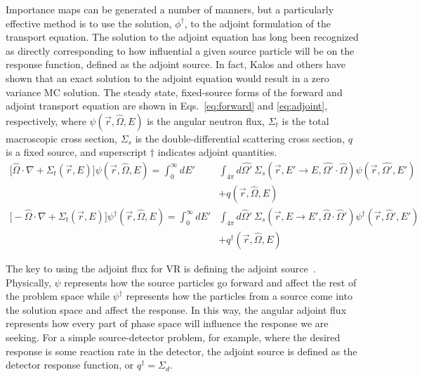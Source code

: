 \documentclass[12pt]{article}
\begin{document}
Importance maps can be generated a number of manners, but a particularly effective method is to use the solution, $\phi^{\dagger}$, to the adjoint formulation of the transport equation. 
The solution to the adjoint equation has long been recognized as 
directly corresponding to how influential a given source particle will be on the response function, defined as the adjoint source.
In fact, Kalos \cite{kalos_importance_1963, goertzel_monte_1958} and others have shown that an exact solution to the adjoint equation would result in a zero variance MC solution. 
The steady state, fixed-source forms of the forward and adjoint transport equation are shown in Eqs.~\ref{eq:forward} and \ref{eq:adjoint}, respectively, where $\psi(\vec{r}, \hat{\Omega}, E)$ is the angular neutron flux, $\Sigma_t$ is the total macroscopic cross section, $\Sigma_s$ is the double-differential scattering cross section, $q$ is a fixed source, and superscript $\dagger$ indicates adjoint quantities.
\begin{subequations} 
\label{eq:transport}
\begin{align}
\bigl[\hat{\Omega} \cdot \nabla + {\ensuremath{\Sigma}}_t(\vec{r}, E)\bigr] \psi(\vec{r}, \hat{\Omega}, E)  =  \int_0^{\infty} dE' &\int_{4\pi} d\hat{\Omega'} \:{\ensuremath{\Sigma}}_{s}(\vec{r}, E' \to E, \hat{\Omega'} \cdot \hat{\Omega}) \psi(\vec{r}, \hat{\Omega'}, E')\nonumber \\
 &+ q(\vec{r}, {\ensuremath{\hat{\Omega}}}, E) \label{eq:forward} \\
\bigl[-{\ensuremath{\hat{\Omega}}} \cdot \nabla + \Sigma_t({\ensuremath{\vec{r}}}, E)\bigr] \psi^{\dagger}(\vec{r}, {\ensuremath{\hat{\Omega}}}, E) = \int_0^{\infty} dE' &\int_{4\pi} d{\ensuremath{\hat{\Omega}}}' \: \Sigma_s({\ensuremath{\vec{r}}}, E \rightarrow E', {\ensuremath{\hat{\Omega}}} \cdot {\ensuremath{\hat{\Omega}}}') \psi^{\dagger}({\ensuremath{\vec{r}}}, {\ensuremath{\hat{\Omega}}}', E') \nonumber \\
&+ q^{\dagger}(\vec{r}, {\ensuremath{\hat{\Omega}}}, E) \label{eq:adjoint}
\end{align}
\end{subequations}

The key to using the adjoint flux for VR is defining the adjoint source~\cite{wagner_forward-weighted_2007}. 
Physically, $\psi$ represents how the source particles go forward and affect the rest of the problem space while $\psi^{\dagger}$ represents how the particles from a source come into the solution space and affect the response. 
In this way, the angular adjoint flux represents how every part of phase space will influence the response we are seeking.
For a simple source-detector problem, for example, where the desired response is some reaction rate in the detector, the adjoint source is defined as the detector response function, or $q^\dagger = \Sigma _{ d }$. 
\end{document}
